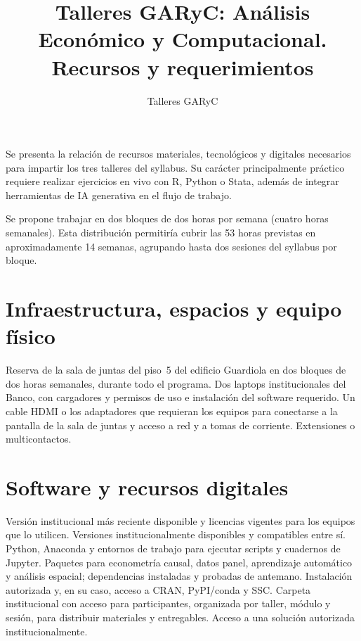 \documentclass[11pt]{article}
\title{Talleres GARyC: Análisis Económico y Computacional. Recursos y requerimientos}
\author{Talleres GARyC}
\date{}
\begin{document}

\begin{presentacion}
Se presenta la relación de recursos materiales, tecnológicos y digitales
necesarios para impartir los tres talleres del syllabus. Su carácter
principalmente práctico requiere realizar ejercicios en vivo con R, Python o
Stata, además de integrar herramientas de IA generativa en el flujo de
trabajo.

Se propone trabajar en dos bloques de dos horas por semana (cuatro horas
semanales). Esta distribución permitiría cubrir las 53 horas previstas en
aproximadamente 14 semanas, agrupando hasta dos sesiones del syllabus por
bloque.
\end{presentacion}

\section{Infraestructura, espacios y equipo físico}
\begin{recursos}
 Reserva de la sala de juntas del piso~5 del
  edificio Guardiola en dos bloques de dos horas semanales, durante todo el
  programa.
 Dos laptops institucionales del Banco,
  con cargadores y permisos de uso e instalación del software requerido.
 Un cable HDMI o los adaptadores que requieran
  los equipos para conectarse a la pantalla de la sala de juntas y acceso a
  red y a tomas de corriente.
 Extensiones o multicontactos.
\end{recursos}

\section{Software y recursos digitales}
\begin{recursos}
 Versión institucional más reciente disponible y licencias
  vigentes para los equipos que lo utilicen.
 Versiones institucionalmente disponibles y
  compatibles entre sí.
 Python, Anaconda y entornos de trabajo para
  ejecutar scripts y cuadernos de Jupyter.
 Paquetes para econometría causal, datos
  panel, aprendizaje automático y análisis espacial; dependencias instaladas
  y probadas de antemano.
 Instalación autorizada y, en su caso, acceso a
  CRAN, PyPI/conda y SSC.
 Carpeta institucional con acceso para
  participantes, organizada por taller, módulo y sesión, para distribuir
  materiales y entregables.
 Acceso a una solución autorizada
  institucionalmente.
\end{recursos}
\end{document}
